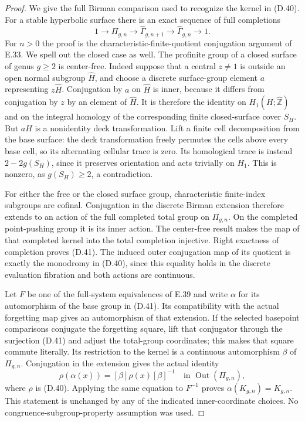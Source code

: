 \begin{proof}
We give the full Birman comparison used to recognize the
kernel in (D.40).  For a stable hyperbolic surface there is
an exact sequence of full completions
\[
 1\longrightarrow\Pi_{g,n}\longrightarrow
 \widehat\Gamma_{g,n+1}\longrightarrow
 \widehat\Gamma_{g,n}\longrightarrow1.                       \tag{D.41}
\]
For $n>0$ the proof is the characteristic-finite-quotient
conjugation argument of E.33.  We spell out the closed case
as well.  The profinite group of a closed surface of genus
$g\geq2$ is center-free.  Indeed suppose that a central
$z\ne1$ is outside an open normal subgroup $\widehat H$,
and choose a discrete surface-group element $a$ representing
$z\widehat H$.  Conjugation by $a$ on $\widehat H$ is inner,
because it differs from conjugation by $z$ by an element of
$\widehat H$.  It is therefore the identity on
$H_1(H;\widehat{\mathbb Z})$ and on the integral homology of
the corresponding finite closed-surface cover $S_H$.
But $aH$ is a nonidentity deck transformation.  Lift a finite
cell decomposition from the base surface: the deck
transformation freely permutes the cells above every base
cell, so its alternating cellular trace is zero.  Its
homological trace is instead $2-2g(S_H)$, since it preserves
orientation and acts trivially on $H_1$.  This is nonzero,
as $g(S_H)\geq2$, a contradiction.

For either the free or the closed surface group, characteristic
finite-index subgroups are cofinal.  Conjugation in the
discrete Birman extension therefore extends to an action of
the full completed total group on $\Pi_{g,n}$.  On the
completed point-pushing group it is its inner action.  The
center-free result makes the map of that completed kernel
into the total completion injective.  Right exactness of
completion proves (D.41).  The induced outer conjugation
map of its quotient is exactly the monodromy in (D.40),
since this equality holds in the discrete evaluation
fibration and both actions are continuous.

Let $F$ be one of the full-system equivalences of E.39 and
write $\alpha$ for its automorphism of the base group in
(D.41).  Its compatibility with the actual forgetting map
gives an automorphism of that extension.  If the selected
basepoint comparisons conjugate the forgetting square,
lift that conjugator through the surjection (D.41) and
adjust the total-group coordinates; this makes that square
commute literally.  Its restriction to the kernel is a
continuous automorphism $\beta$ of $\Pi_{g,n}$.  Conjugation
in the extension gives the actual identity
\[
 \rho(\alpha(x))=[\beta]\rho(x)[\beta]^{-1}
          \quad\text{in }\operatorname{Out}(\Pi_{g,n}),       \tag{D.42}
\]
where $\rho$ is (D.40).  Applying the same equation to
$F^{-1}$ proves $\alpha(K_{g,n})=K_{g,n}$.  This statement
is unchanged by any of the indicated inner-coordinate
choices.  No congruence-subgroup-property assumption was
used.


\end{proof}
